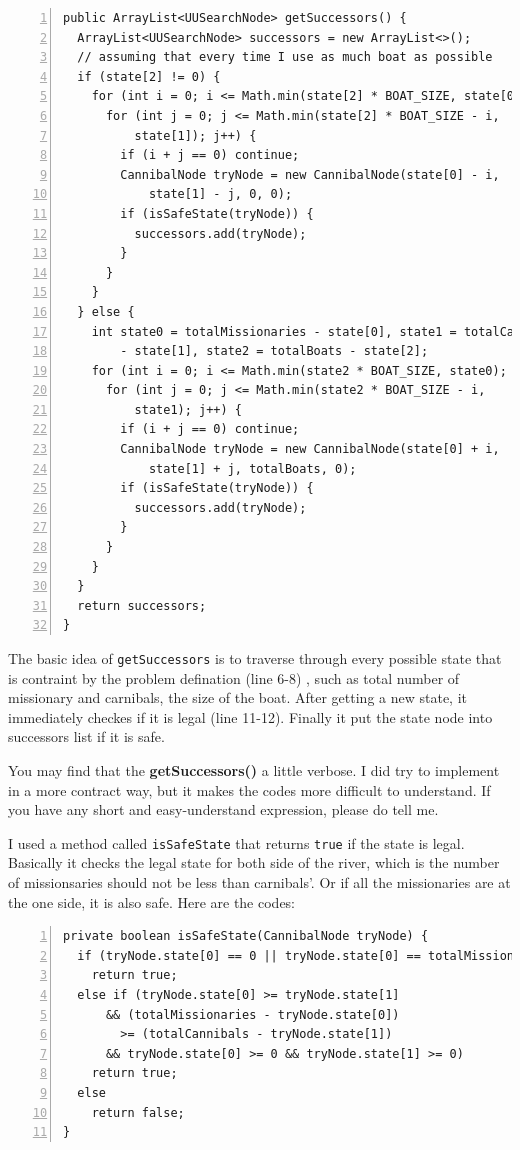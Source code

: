 \documentclass{article}
\begin{document}
\begin{lstlisting}[numbers=left]
public ArrayList<UUSearchNode> getSuccessors() {
  ArrayList<UUSearchNode> successors = new ArrayList<>();
  // assuming that every time I use as much boat as possible
  if (state[2] != 0) {
    for (int i = 0; i <= Math.min(state[2] * BOAT_SIZE, state[0]); i++) {
      for (int j = 0; j <= Math.min(state[2] * BOAT_SIZE - i,
          state[1]); j++) {
        if (i + j == 0) continue;
        CannibalNode tryNode = new CannibalNode(state[0] - i,
            state[1] - j, 0, 0);
        if (isSafeState(tryNode)) {
          successors.add(tryNode);
        }
      }
    }
  } else {
    int state0 = totalMissionaries - state[0], state1 = totalCannibals
        - state[1], state2 = totalBoats - state[2];
    for (int i = 0; i <= Math.min(state2 * BOAT_SIZE, state0); i++) {
      for (int j = 0; j <= Math.min(state2 * BOAT_SIZE - i,
          state1); j++) {
        if (i + j == 0) continue;
        CannibalNode tryNode = new CannibalNode(state[0] + i,
            state[1] + j, totalBoats, 0);
        if (isSafeState(tryNode)) {
          successors.add(tryNode);
        }
      }
    }
  }
  return successors;
}
\end{lstlisting}

The basic idea of \verb`getSuccessors` is to traverse through every possible state that is contraint by the problem defination (line 6-8) , such as total number of missionary and carnibals, the size of the boat. After getting a new state, it immediately checkes if it is legal (line 11-12). Finally it put the state node into successors list if it is safe.

You may find that the \textbf{getSuccessors()} a little verbose. I did try to implement in a more contract way, but it makes the codes more difficult to understand. If you have any short and easy-understand expression, please do tell me.

I used a method called \verb`isSafeState` that returns \verb`true` if the state is legal. Basically it checks the legal state for both side of the river, which is the number of missionsaries should not be less than carnibals'. Or if all the missionaries are at the one side, it is also safe. Here are the codes:

\begin{lstlisting}[numbers=left]
private boolean isSafeState(CannibalNode tryNode) {
  if (tryNode.state[0] == 0 || tryNode.state[0] == totalMissionaries)
    return true;
  else if (tryNode.state[0] >= tryNode.state[1]
      && (totalMissionaries - tryNode.state[0])
      	>= (totalCannibals - tryNode.state[1])
      && tryNode.state[0] >= 0 && tryNode.state[1] >= 0)
    return true;
  else
    return false;
}
\end{lstlisting}
\end{document}
